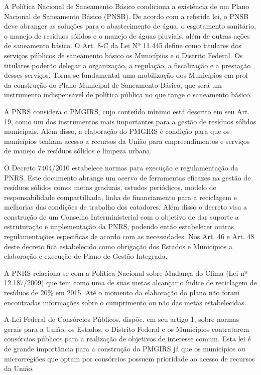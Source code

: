 	A Política Nacional de Saneamento Básico condiciona a existência de um Plano Nacional de Saneamento Básico (PNSB). De acordo com a referida lei, o PNSB deve abranger as soluções para o abastecimento de água, o esgotamento sanitário, o manejo de resíduos sólidos e o manejo de águas pluviais, além de outras ações de saneamento básico. O Art. 8-C da Lei Nº 11.445 define como titulares dos serviços públicos de saneamento básico os Municípios e o Distrito Federal. Os titulares poderão delegar a organização, a regulação, a fiscalização e a prestação desses serviços. Torna-se fundamental uma mobilização dos Municípios em prol da construção do Plano Municipal de Saneamento Básico, que será um instrumento indispensável de política pública no que tange o saneamento básico.
	
	A PNRS considera o PMGIRS, cujo conteúdo mínimo está descrito em seu Art. 19, como um dos instrumentos mais importantes para a gestão de resíduos sólidos municipais. Além disso, a elaboração do PMGIRS é condição para que os municípios tenham acesso a recursos da União para empreendimentos e serviços de manejo de resíduos sólidos e limpeza urbana.
	 
	O Decreto 7404/2010 estabelece normas para execução e regulamentação da PNRS. Este documento abrange um acervo de ferramentas eficazes na gestão de resíduos sólidos como: metas graduais, estudos periódicos, modelo de responsabilidade compartilhada, linha de financiamento para a reciclagem e melhorias das condições de trabalho dos catadores. Além disso o decreto visa a construção de um Conselho Interministerial com o objetivo de dar suporte a estruturação e implementação da PNRS, podendo então estabelecer outras regulamentações especificas de acordo com as necessidades. Nos Art. 46 e Art. 48 deste decreto fica estabelecido como obrigação dos Estados e Municípios a elaboração e execução de Plano de Gestão Integrada.
	
	A PNRS relaciona-se com a Política Nacional sobre Mudança do Clima (Lei nº 12.187/2009) que tem como uma de suas metas alcançar o índice de reciclagem de resíduos de 20\% em 2015. Até o momento da elaboração do plano não foram encontradas informações sobre o cumprimento ou não das metas estabelecidas.  
	
	A Lei Federal de Consórcios Públicos, dispõe, em seu artigo 1, sobre normas gerais para a União, os Estados, o Distrito Federal e os Municípios contratarem consórcios públicos para a realização de objetivos de interesse comum. Esta lei é de grande importância para a construção do PMGIRS já que os municípios ou microrregiões que optam por consórcios possuem prioridade ao acesso de recursos da União.
	
